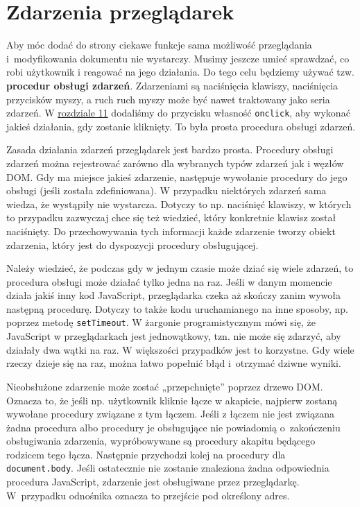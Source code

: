 \chapter{ Zdarzenia przeglądarek}
\label{chap:13}

  
Aby móc dodać do strony ciekawe funkcje sama możliwość przeglądania i~modyfikowania dokumentu nie wystarczy. Musimy jeszcze umieć sprawdzać, co robi użytkownik i reagować na jego działania. Do tego celu będziemy używać tzw. \textbf{procedur obsługi zdarzeń}. Zdarzeniami są naciśnięcia klawiszy, naciśnięcia przycisków myszy, a ruch ruch myszy może być nawet traktowany jako seria zdarzeń. W \hyperref[chap:11]{rozdziale 11} dodaliśmy do przycisku własność \texttt{onclick}, aby wykonać jakieś działania, gdy zostanie kliknięty. To była prosta procedura obsługi zdarzeń.

  
Zasada działania zdarzeń przeglądarek jest bardzo prosta. Procedury obsługi zdarzeń można rejestrować zarówno dla wybranych typów zdarzeń jak i węzłów DOM. Gdy ma miejsce jakieś zdarzenie, następuje wywołanie procedury do jego obsługi (jeśli została zdefiniowana). W przypadku niektórych zdarzeń sama wiedza, że wystąpiły nie wystarcza. Dotyczy to np. naciśnięć klawiszy, w których to przypadku zazwyczaj chce się też wiedzieć, który konkretnie klawisz został naciśnięty. Do przechowywania tych informacji każde zdarzenie tworzy obiekt zdarzenia, który jest do dyspozycji procedury obsługującej.

  
Należy wiedzieć, że podczas gdy w jednym czasie może dziać się wiele zdarzeń, to procedura obsługi może działać tylko jedna na raz. Jeśli w danym momencie działa jakiś inny kod JavaScript, przeglądarka czeka aż skończy zanim wywoła następną procedurę. Dotyczy to także kodu uruchamianego na inne sposoby, np. poprzez metodę \texttt{setTimeout}. W żargonie programistycznym mówi się, że JavaScript w przeglądarkach jest jednowątkowy, tzn. nie może się zdarzyć, aby działały dwa wątki na raz. W większości przypadków jest to korzystne. Gdy wiele rzeczy dzieje się na raz, można łatwo popełnić błąd i~otrzymać dziwne wyniki.

  
Nieobsłużone zdarzenie może zostać „przepchnięte” poprzez drzewo DOM. Oznacza to, że jeśli np. użytkownik kliknie łącze w akapicie, najpierw zostaną wywołane procedury związane z tym łączem. Jeśli z łączem nie jest związana żadna procedura albo procedury je obsługujące nie powiadomią o~zakończeniu obsługiwania zdarzenia, wypróbowywane są procedury akapitu będącego rodzicem tego łącza. Następnie przychodzi kolej na procedury dla \texttt{document.body}. Jeśli ostatecznie nie zostanie znaleziona żadna odpowiednia procedura JavaScript, zdarzenie jest obsługiwane przez przeglądarkę. W~przypadku odnośnika oznacza to przejście pod określony adres.



